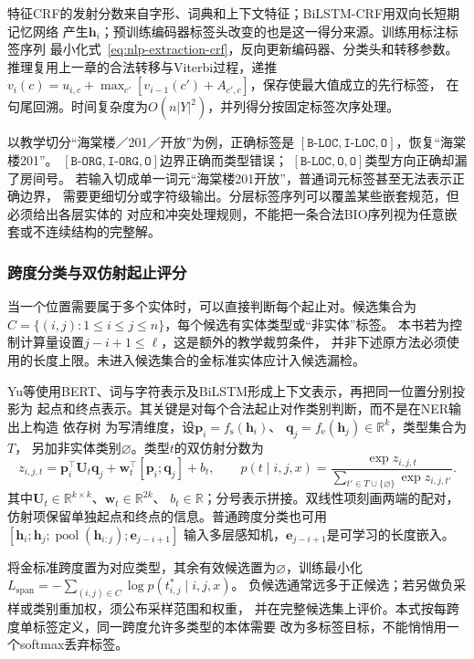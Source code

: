 特征CRF的发射分数来自字形、词典和上下文特征；BiLSTM-CRF用双向长短期记忆网络
产生$\bm{h}_i$；预训练编码器标签头改变的也是这一得分来源。训练用标注标签序列
最小化式~\eqref{eq:nlp-extraction-crf}，反向更新编码器、分类头和转移参数。
推理复用上一章的合法转移与Viterbi过程，递推
$v_i(c)=u_{i,c}+\max_{c'}[v_{i-1}(c')+A_{c',c}]$，保存使最大值成立的先行标签，
在句尾回溯。时间复杂度为$O(n|Y|^2)$，并列得分按固定标签次序处理。

以教学切分“海棠楼／201／开放”为例，正确标签是
$[\texttt{B-LOC},\texttt{I-LOC},\texttt{O}]$，恢复“海棠楼201”。
$[\texttt{B-ORG},\texttt{I-ORG},\texttt{O}]$边界正确而类型错误；
$[\texttt{B-LOC},\texttt{O},\texttt{O}]$类型方向正确却漏了房间号。
若输入切成单一词元“海棠楼201开放”，普通词元标签甚至无法表示正确边界，
需要更细切分或字符级输出。分层标签序列可以覆盖某些嵌套规范，但必须给出各层实体的
对应和冲突处理规则，不能把一条合法BIO序列视为任意嵌套或不连续结构的完整解。

\subsubsection{跨度分类与双仿射起止评分}
\label{sec:nlp-extraction-biaffine}

当一个位置需要属于多个实体时，可以直接判断每个起止对。候选集合为
$C=\{(i,j):1\leq i\leq j\leq n\}$，每个候选有实体类型或“非实体”标签。
本书若为控制计算量设置$j-i+1\leq\ell$，这是额外的教学裁剪条件，
并非下述原方法必须使用的长度上限。未进入候选集合的金标准实体应计入候选漏检。

Yu等使用BERT、词与字符表示及BiLSTM形成上下文表示，再把同一位置分别投影为
起点和终点表示。其关键是对每个合法起止对作类别判断，而不是在NER输出上构造
依存树
为写清维度，设$\bm{p}_i=f_{\mathrm{s}}(\bm{h}_i)$、
$\bm{q}_j=f_{\mathrm{e}}(\bm{h}_j)\in\mathbb{R}^{k}$，类型集合为$T$，
另加非实体类别$\varnothing$。类型$t$的双仿射分数为
\begin{equation}
  z_{i,j,t}=
  \bm{p}_i^\top\bm{U}_t\bm{q}_j+
  \bm{w}_t^\top[\bm{p}_i;\bm{q}_j]+b_t,
  \qquad
  p(t\mid i,j,x)=
  \frac{\exp z_{i,j,t}}{\sum_{t'\in T\cup\{\varnothing\}}\exp z_{i,j,t'}}.
  \label{eq:nlp-extraction-biaffine}
\end{equation}
其中$\bm{U}_t\in\mathbb{R}^{k\times k}$、$\bm{w}_t\in\mathbb{R}^{2k}$、
$b_t\in\mathbb{R}$；分号表示拼接。双线性项刻画两端的配对，
仿射项保留单独起点和终点的信息。普通跨度分类也可用
$[\bm{h}_i;\bm{h}_j;\operatorname{pool}(\bm{h}_{i:j});\bm{e}_{j-i+1}]$
输入多层感知机，$\bm{e}_{j-i+1}$是可学习的长度嵌入。

将金标准跨度置为对应类型，其余有效候选置为$\varnothing$，训练最小化
$L_{\mathrm{span}}=-\sum_{(i,j)\in C}\log p(t^{*}_{i,j}\mid i,j,x)$。
负候选通常远多于正候选；若另做负采样或类别重加权，须公布采样范围和权重，
并在完整候选集上评价。本式按每跨度单标签定义，同一跨度允许多类型的本体需要
改为多标签目标，不能悄悄用一个softmax丢弃标签。

